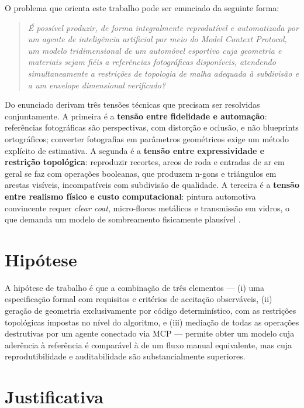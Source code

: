 O problema que orienta este trabalho pode ser enunciado da seguinte forma:

\begin{quote}
\emph{\'E poss\'ivel produzir, de forma integralmente reprodut\'ivel e automatizada por um
agente de intelig\^encia artificial por meio do Model Context Protocol, um modelo tridimensional
de um autom\'ovel esportivo cuja geometria e materiais sejam fi\'eis a refer\^encias fotogr\'aficas
dispon\'iveis, atendendo simultaneamente a restri\c{c}\~oes de topologia de malha adequada \`a
subdivis\~ao e a um envelope dimensional verificado?}
\end{quote}

Do enunciado derivam tr\^es tens\~oes t\'ecnicas que precisam ser resolvidas conjuntamente. A
primeira \'e a \textbf{tens\~ao entre fidelidade e automa\c{c}\~ao}: refer\^encias fotogr\'aficas
s\~ao perspectivas, com distor\c{c}\~ao e oclus\~ao, e n\~ao blueprints ortogr\'aficos; converter
fotografias em par\^ametros geom\'etricos exige um m\'etodo expl\'icito de estimativa. A segunda
\'e a \textbf{tens\~ao entre expressividade e restri\c{c}\~ao topol\'ogica}: reproduzir recortes,
arcos de roda e entradas de ar em geral se faz com opera\c{c}\~oes booleanas, que produzem
n-gons e tri\'angulos em arestas vis\'iveis, incompat\'iveis com subdivis\~ao de qualidade. A
terceira \'e a \textbf{tens\~ao entre realismo f\'isico e custo computacional}: pintura
automotiva convincente requer \emph{clear coat}, micro-flocos met\'alicos e transmiss\~ao em
vidros, o que demanda um modelo de sombreamento fisicamente plaus\'ivel
\cite{burley2012, karis2013}.

\section{Hip\'otese}

A hip\'otese de trabalho \'e que a combina\c{c}\~ao de tr\^es elementos --- (i) uma
especifica\c{c}\~ao formal com requisitos e crit\'erios de aceita\c{c}\~ao observ\'aveis,
(ii) gera\c{c}\~ao de geometria exclusivamente por c\'odigo determin\'istico, com as
restri\c{c}\~oes topol\'ogicas impostas no n\'ivel do algoritmo, e (iii) media\c{c}\~ao de todas
as opera\c{c}\~oes destrutivas por um agente conectado via MCP --- permite obter um modelo cuja
ader\^encia \`a refer\^encia \'e compar\'avel \`a de um fluxo manual equivalente, mas cuja
reprodutibilidade e auditabilidade s\~ao substancialmente superiores.

\section{Justificativa}

